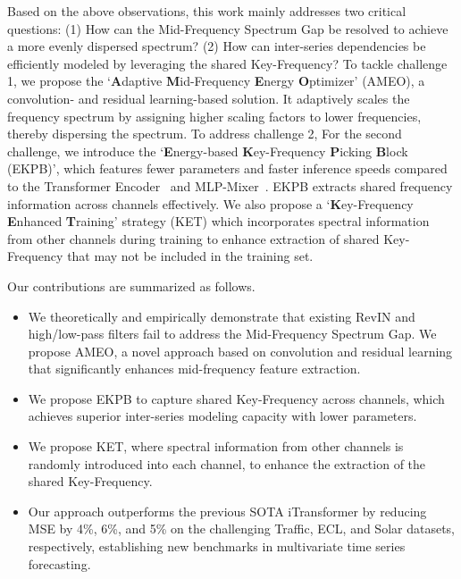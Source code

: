 Based on the above observations, this work mainly addresses two critical questions: (1) How can the Mid-Frequency Spectrum Gap be resolved to achieve a more evenly dispersed spectrum? (2) How can inter-series dependencies be efficiently modeled by leveraging the shared Key-Frequency?  
%
To tackle challenge 1, we propose the `\textbf{A}daptive \textbf{M}id-Frequency \textbf{E}nergy \textbf{O}ptimizer' (AMEO), a convolution- and residual learning-based solution. It adaptively scales the frequency spectrum by assigning higher scaling factors to lower frequencies, thereby dispersing the spectrum. 
%
To address challenge 2, For the second challenge, we introduce the `\textbf{E}nergy-based \textbf{K}ey-Frequency \textbf{P}icking \textbf{B}lock (EKPB)', which features fewer parameters and faster inference speeds compared to the Transformer Encoder~\citep{LiuiTransformer} and MLP-Mixer~\citep{chen2023tsmixer}. EKPB extracts shared frequency information across channels effectively.  We also propose a `\textbf{K}ey-Frequency \textbf{E}nhanced \textbf{T}raining' strategy 
(KET) which incorporates spectral information from other channels during training to enhance extraction of shared Key-Frequency that may not be included in the training set.

Our contributions are summarized as follows. 
\vspace{-0.25cm}
\begin{itemize}
\item We theoretically and empirically demonstrate that existing RevIN and high/low-pass filters fail to address the Mid-Frequency Spectrum Gap. We propose AMEO, a novel approach based on convolution and residual learning that significantly enhances mid-frequency feature extraction. 
\vspace{-0.25cm}
\item We propose EKPB to capture shared Key-Frequency across channels, which achieves superior inter-series modeling capacity with lower parameters. 
\vspace{-0.25cm}
\item We propose KET, where spectral information from other channels is randomly introduced into each channel, to enhance the extraction of the shared Key-Frequency.
\vspace{-0.25cm}
\item Our approach outperforms the previous SOTA iTransformer by reducing MSE by 4\%, 6\%, and 5\% on the challenging Traffic, ECL, and Solar datasets, respectively, establishing new benchmarks in multivariate time series forecasting. 
\end{itemize}
